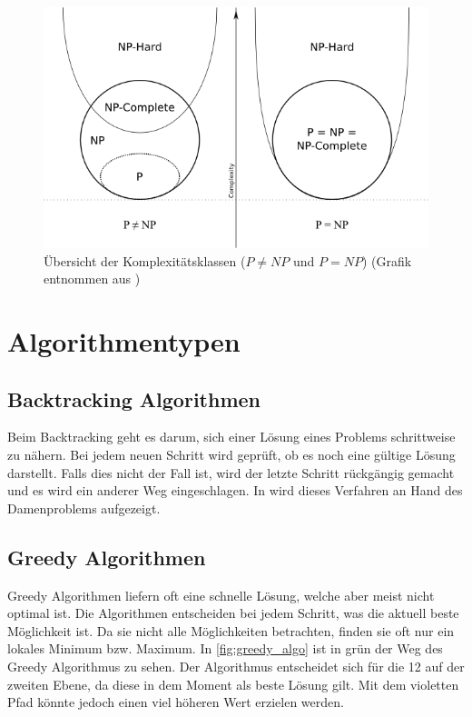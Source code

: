 \begin{figure}[h]
\includegraphics[scale=0.7]{images/einleitung/p_np_np-complete_np-hard.png}
\caption[Übersicht der Komplexitätsklassen ($P!=NP$ und $P=NP$)]{Übersicht der Komplexitätsklassen ($P \neq NP$ und $P=NP$) (Grafik entnommen aus \cite{pic_p_np})}
\label{fig:complexity_overview}
\end{figure}

\section{Algorithmentypen}\label{algo_types}

\subsection{Backtracking Algorithmen}\label{backtracking_algos}
Beim Backtracking geht es darum, sich einer Lösung eines Problems schrittweise zu nähern. Bei jedem neuen Schritt wird geprüft, ob es noch eine gültige Lösung darstellt. Falls dies nicht der 
Fall ist, wird der letzte Schritt rückgängig gemacht und es wird ein anderer Weg eingeschlagen. In \cite{backtracking} wird dieses Verfahren an Hand des Damenproblems aufgezeigt.

\subsection{Greedy Algorithmen}\label{greedy_algos}
Greedy Algorithmen liefern oft eine schnelle Lösung, welche aber meist nicht optimal ist. Die Algorithmen entscheiden bei jedem Schritt, was die aktuell beste Möglichkeit ist. Da sie nicht alle Möglichkeiten betrachten, finden sie oft nur ein lokales Minimum bzw. Maximum. In \autoref{fig:greedy_algo} ist in grün der Weg des Greedy Algorithmus zu sehen. Der Algorithmus entscheidet sich für die 12 auf der zweiten Ebene, da diese in dem Moment als beste Lösung gilt. Mit dem violetten Pfad könnte jedoch einen viel höheren Wert erzielen werden.

